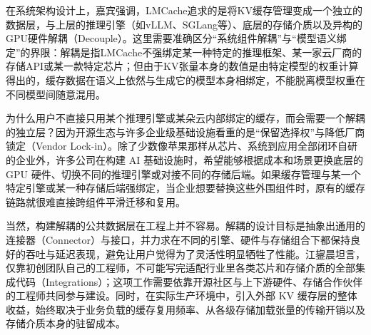 \documentclass[UTF8,a4paper,11pt,fontset=fandol]{ctexart}
\begin{document}
在系统架构设计上，嘉宾强调，LMCache追求的是将KV缓存管理变成一个独立的数据层，与上层的推理引擎（如vLLM、SGLang等）、底层的存储介质以及异构的GPU硬件解耦（Decouple）。这里需要准确区分“系统组件解耦”与“模型语义绑定”的界限：解耦是指LMCache不强绑定某一种特定的推理框架、某一家云厂商的存储API或某一款特定芯片；但由于KV张量本身的数值是由特定模型的权重计算得出的，缓存数据在语义上依然与生成它的模型本身相绑定，不能脱离模型权重在不同模型间随意混用。

为什么用户不直接只用某个推理引擎或某朵云内部绑定的缓存，而会需要一个解耦的独立层？因为开源生态与许多企业级基础设施看重的是“保留选择权”与降低厂商锁定（Vendor Lock-in）。除了少数像苹果那样从芯片、系统到应用全部闭环自研的企业外，许多公司在构建 AI 基础设施时，希望能够根据成本和场景更换底层的 GPU 硬件、切换不同的推理引擎或对接不同的存储后端。如果缓存管理与某一个特定引擎或某一种存储后端强绑定，当企业想要替换这些外围组件时，原有的缓存链路就很难直接跨组件平滑迁移和复用。

当然，构建解耦的公共数据层在工程上并不容易。解耦的设计目标是抽象出通用的连接器（Connector）与接口，并力求在不同的引擎、硬件与存储组合下都保持良好的吞吐与延迟表现，避免让用户觉得为了灵活性明显牺牲了性能。江鋆晨坦言，仅靠初创团队自己的工程师，不可能写完适配行业里各类芯片和存储介质的全部集成代码（Integrations）；这项工作需要依靠开源社区与上下游硬件、存储合作伙伴的工程师共同参与建设。同时，在实际生产环境中，引入外部 KV 缓存层的整体收益，始终取决于业务负载的缓存复用频率、从各级存储加载张量的传输开销以及存储介质本身的驻留成本。
\end{document}
